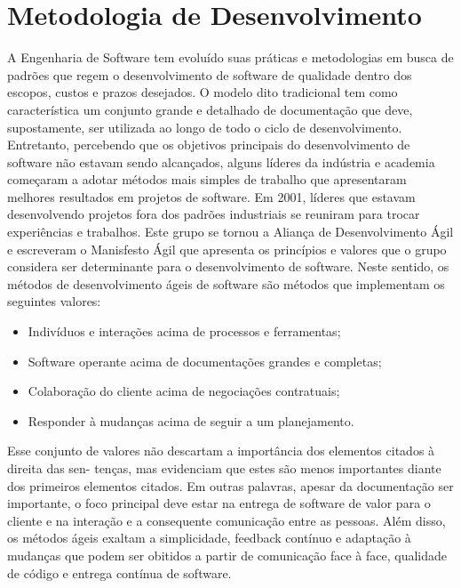 \section{Metodologia de Desenvolvimento}
\label{sec:metodologia}

A Engenharia de Software tem evoluído suas práticas e metodologias em busca de padrões que regem o desenvolvimento de software de qualidade dentro dos escopos, custos e prazos desejados. O modelo dito tradicional tem como característica um conjunto grande e detalhado de documentação que deve, supostamente, ser utilizada ao longo de todo o ciclo de desenvolvimento. Entretanto, percebendo que os objetivos principais do desenvolvimento de software não estavam sendo alcançados, alguns líderes da indústria e academia começaram a adotar métodos mais simples de trabalho que apresentaram melhores resultados em projetos de software. Em 2001, líderes que estavam desenvolvendo projetos fora dos padrões industriais se reuniram para trocar experiências e trabalhos. Este grupo se tornou a Aliança de Desenvolvimento Ágil e escreveram o Manisfesto Ágil que apresenta os princípios e valores que o grupo considera ser determinante para o desenvolvimento de software. Neste sentido, os métodos de desenvolvimento ágeis de software são métodos que implementam os seguintes valores:

\begin{itemize}

\item Indivíduos e interações acima de processos e ferramentas; 

\item Software operante acima de documentações grandes e completas; 

\item Colaboração do cliente acima de negociações contratuais; 

\item Responder à mudanças acima de seguir a um planejamento.

\end{itemize}

Esse conjunto de valores não descartam a importância dos elementos citados à direita das sen- 
tenças, mas evidenciam que estes são menos importantes diante dos primeiros elementos citados. 
Em outras palavras, apesar da documentação ser importante, o foco principal deve estar na entrega 
de software de valor para o cliente e na interação e a consequente comunicação entre as pessoas. 
Além disso, os métodos ágeis exaltam a simplicidade, feedback contínuo e adaptação à mudanças 
que podem ser obitidos a partir de comunicação face à face, qualidade de código e entrega contínua 
de software. 

